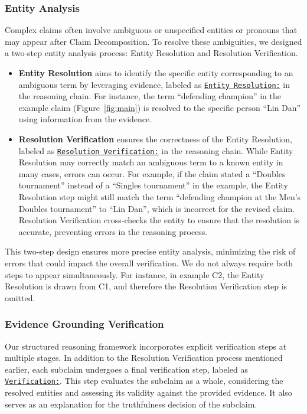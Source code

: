 \subsubsection{Entity Analysis}
Complex claims often involve ambiguous or unspecified entities or pronouns that may appear after Claim Decomposition. To resolve these ambiguities, we designed a two-step entity analysis process: Entity Resolution and Resolution Verification.
\begin{itemize}
    \item \textbf{Entity Resolution} aims to identify the specific entity corresponding to an ambiguous term by leveraging evidence, labeled as \underline{\texttt{Entity Resolution:}} in the reasoning chain. For instance, the term ``defending champion'' in the example claim (Figure~\ref{fig:main}) is resolved to the specific person ``Lin Dan'' using information from the evidence.
    \item \textbf{Resolution Verification} ensures the correctness of the Entity Resolution, labeled as \underline{\texttt{Resolution Verification:}} in the reasoning chain. While Entity Resolution may correctly match an ambiguous term to a known entity in many cases, errors can occur. For example, if the claim stated a ``Doubles tournament'' instead of a ``Singles tournament'' in the example, the Entity Resolution step might still match the term ``defending champion at the Men's Doubles tournament'' to ``Lin Dan'', which is incorrect for the revised claim. Resolution Verification cross-checks the entity to ensure that the resolution is accurate, preventing errors in the reasoning process.
\end{itemize}

This two-step design ensures more precise entity analysis, minimizing the risk of errors that could impact the overall verification. We do not always require both steps to appear simultaneously. For instance, in example C2, the Entity Resolution is drawn from C1, and therefore the Resolution Verification step is omitted.

\subsubsection{Evidence Grounding Verification}
Our structured reasoning framework incorporates explicit verification steps at multiple stages. In addition to the Resolution Verification process mentioned earlier, each subclaim undergoes a final verification step, labeled as \underline{\texttt{Verification:}}. This step evaluates the subclaim as a whole, considering the resolved entities and assessing its validity against the provided evidence. It also serves as an explanation for the truthfulness decision of the subclaim.

